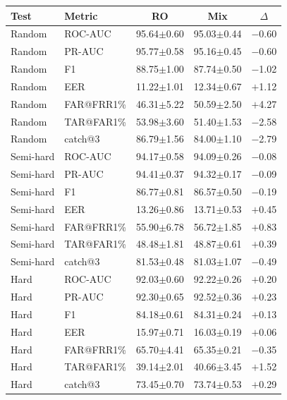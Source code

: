 \documentclass[11pt]{article}
\begin{document}
\begin{table}[!t]
\begin{minipage}[t]{0.48\textwidth}
\centering
\begin{tabular}{l l c c c}
\toprule
\textbf{Test} & \textbf{Metric} & \textbf{RO} & \textbf{Mix} & \textbf{$\Delta$} \\
\midrule
Random    & ROC-AUC    & 95.64$\pm$0.60 & 95.03$\pm$0.44 & $-$0.60 \\
Random    & PR-AUC     & 95.77$\pm$0.58 & 95.16$\pm$0.45 & $-$0.60 \\
Random    & F1         & 88.75$\pm$1.00 & 87.74$\pm$0.50 & $-$1.02 \\
Random    & EER        & 11.22$\pm$1.01 & 12.34$\pm$0.67 & $+$1.12 \\
Random    & FAR@FRR1\% & 46.31$\pm$5.22 & 50.59$\pm$2.50 & $+$4.27 \\
Random    & TAR@FAR1\% & 53.98$\pm$3.60 & 51.40$\pm$1.53 & $-$2.58 \\
Random    & catch@3    & 86.79$\pm$1.56 & 84.00$\pm$1.10 & $-$2.79 \\
\midrule
Semi-hard & ROC-AUC    & 94.17$\pm$0.58 & 94.09$\pm$0.26 & $-$0.08 \\
Semi-hard & PR-AUC     & 94.41$\pm$0.37 & 94.32$\pm$0.17 & $-$0.09 \\
Semi-hard & F1         & 86.77$\pm$0.81 & 86.57$\pm$0.50 & $-$0.19 \\
Semi-hard & EER        & 13.26$\pm$0.86 & 13.71$\pm$0.53 & $+$0.45 \\
Semi-hard & FAR@FRR1\% & 55.90$\pm$6.78 & 56.72$\pm$1.85 & $+$0.83 \\
Semi-hard & TAR@FAR1\% & 48.48$\pm$1.81 & 48.87$\pm$0.61 & $+$0.39 \\
Semi-hard & catch@3    & 81.53$\pm$0.48 & 81.03$\pm$1.07 & $-$0.49 \\
\midrule
Hard      & ROC-AUC    & 92.03$\pm$0.60 & 92.22$\pm$0.26 & $+$0.20 \\
Hard      & PR-AUC     & 92.30$\pm$0.65 & 92.52$\pm$0.36 & $+$0.23 \\
Hard      & F1         & 84.18$\pm$0.61 & 84.31$\pm$0.24 & $+$0.13 \\
Hard      & EER        & 15.97$\pm$0.71 & 16.03$\pm$0.19 & $+$0.06 \\
Hard      & FAR@FRR1\% & 65.70$\pm$4.41 & 65.35$\pm$0.21 & $-$0.35 \\
Hard      & TAR@FAR1\% & 39.14$\pm$2.01 & 40.66$\pm$3.45 & $+$1.52 \\
Hard      & catch@3    & 73.45$\pm$0.70 & 73.74$\pm$0.53 & $+$0.29 \\

\end{tabular}
\end{minipage}
\end{table}
\end{document}
